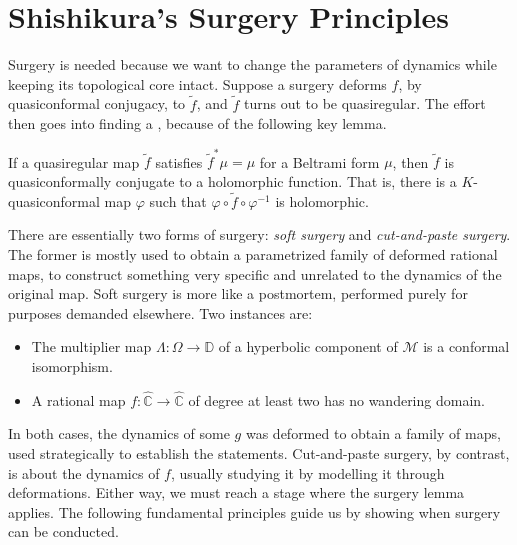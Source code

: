 \documentclass[11pt,a4paper]{article}
\begin{document}
\section*{Shishikura's Surgery Principles}
Surgery is needed because we want to change the parameters of dynamics while keeping its topological core intact. Suppose a surgery deforms \(f\), by quasiconformal conjugacy, to \(\widetilde f\), and \(\widetilde f\) turns out to be quasiregular. The effort then goes into finding a , because of the following key lemma.
\setcounter{theorem}{47}\begin{lemma}
If a quasiregular map \(\widetilde f\) satisfies \(\widetilde f^*\mu=\mu\) for a Beltrami form \(\mu\), then \(\widetilde f\) is quasiconformally conjugate to a holomorphic function. That is, there is a \(K\)-quasiconformal map \(\varphi\) such that \(\varphi\circ\widetilde f\circ\varphi^{-1}\) is holomorphic.
\end{lemma}
There are essentially two forms of surgery: \emph{soft surgery} and \emph{cut-and-paste surgery}. The former is mostly used to obtain a parametrized family of deformed rational maps, to construct something very specific and unrelated to the dynamics of the original map. Soft surgery is more like a postmortem, performed purely for purposes demanded elsewhere. Two instances are:
\begin{itemize}
\item The multiplier map \(\Lambda:\Omega\to\mathbb D\) of a hyperbolic component of \(\mathcal M\) is a conformal isomorphism.
\item A rational map \(f:\widehat{\mathbb C}\to\widehat{\mathbb C}\) of degree at least two has no wandering domain.
\end{itemize}
In both cases, the dynamics of some \(g\) was deformed to obtain a family of maps, used strategically to establish the statements.
Cut-and-paste surgery, by contrast, is about the dynamics of \(f\), usually studying it by modelling it through deformations.
Either way, we must reach a stage where the surgery lemma applies. The following fundamental principles guide us by showing when surgery can be conducted.
\end{document}
